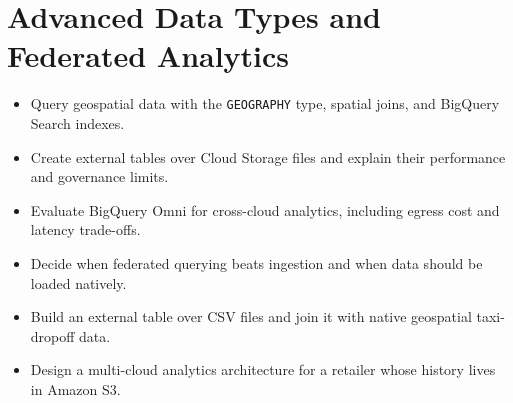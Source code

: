 \chapter{Advanced Data Types and Federated Analytics}

\begin{objectives}
\begin{itemize}
    \item Query geospatial data with the \texttt{GEOGRAPHY} type, spatial joins, and BigQuery Search indexes.
    \item Create external tables over Cloud Storage files and explain their performance and governance limits.
    \item Evaluate BigQuery Omni for cross-cloud analytics, including egress cost and latency trade-offs.
    \item Decide when federated querying beats ingestion and when data should be loaded natively.
    \item Build an external table over CSV files and join it with native geospatial taxi-dropoff data.
    \item Design a multi-cloud analytics architecture for a retailer whose history lives in Amazon S3.
\end{itemize}
\end{objectives}

